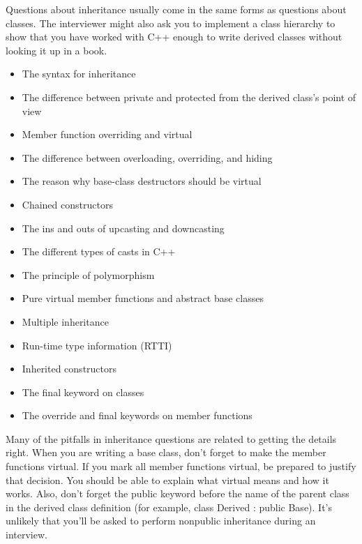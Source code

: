 
Questions about inheritance usually come in the same forms as questions about classes. The interviewer might also ask you to implement a class hierarchy to show that you have worked with C++ enough to write derived classes without looking it up in a book.


\begin{itemize}
\item
The syntax for inheritance

\item
The difference between private and protected from the derived class’s point of view

\item
Member function overriding and virtual

\item
The difference between overloading, overriding, and hiding

\item
The reason why base-class destructors should be virtual

\item
Chained constructors

\item
The ins and outs of upcasting and downcasting

\item
The different types of casts in C++

\item
The principle of polymorphism

\item
Pure virtual member functions and abstract base classes

\item
Multiple inheritance

\item
Run-time type information (RTTI)

\item
Inherited constructors

\item
The final keyword on classes

\item
The override and final keywords on member functions
\end{itemize}


Many of the pitfalls in inheritance questions are related to getting the details right. When you are writing a base class, don’t forget to make the member functions virtual. If you mark all member functions virtual, be prepared to justify that decision. You should be able to explain what virtual means and how it works. Also, don’t forget the public keyword before the name of the parent class in the derived class definition (for example, class Derived : public Base). It’s unlikely that you’ll be asked to perform nonpublic inheritance during an interview.

